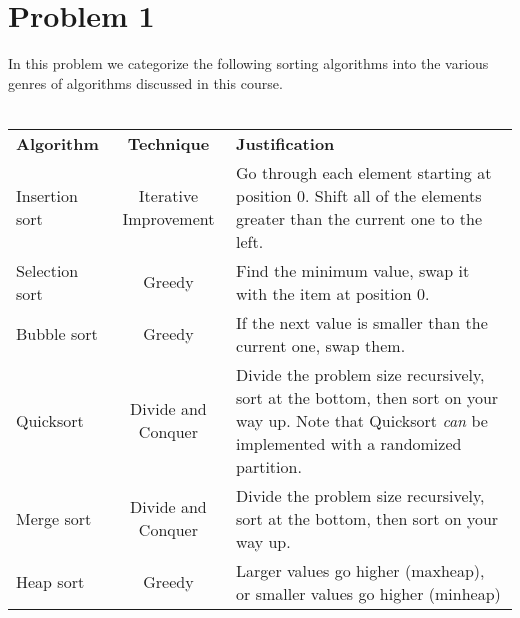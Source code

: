 \section*{Problem 1}

In this problem we categorize the following sorting algorithms into the
various genres of algorithms discussed in this course.
\\
\\
\begin{tabular}{l c p{6cm}}
    \textbf{Algorithm} & \textbf{Technique} & \textbf{Justification} \\
    Insertion sort & Iterative Improvement & Go through each element starting at position 0. Shift all of the elements greater than the current one to the left.\\
    Selection sort & Greedy & Find the minimum value, swap it with the item at position 0.\\
    Bubble sort & Greedy & If the next value is smaller than the current one, swap them.\\
    Quicksort & Divide and Conquer & Divide the problem size recursively, sort at the bottom, then sort on your way up. Note that Quicksort \textit{can} be implemented with a randomized partition.\\
    Merge sort & Divide and Conquer & Divide the problem size recursively, sort at the bottom, then sort on your way up.\\
    Heap sort & Greedy & Larger values go higher (maxheap), or smaller values go higher (minheap)\\
\end{tabular}
